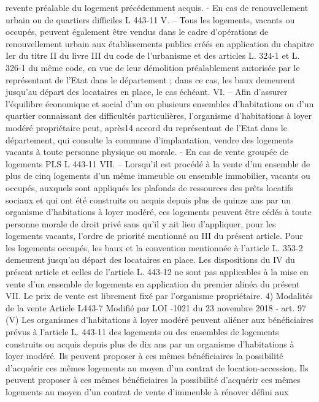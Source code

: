 \documentclass[11pt,a4paper]{report}
\begin{document}
	revente préalable du logement précédemment acquis.
	- En cas de renouvellement urbain ou de quartiers difficiles
	L 443-11 V. – Tous les logements, vacants ou occupés, peuvent également être vendus dans le cadre
	d'opérations de renouvellement urbain aux établissements publics créés en application du chapitre Ier du titre II
	du livre III du code de l'urbanisme et des articles L. 324-1 et L. 326-1 du même code, en vue de leur démolition
	préalablement autorisée par le représentant de l'Etat dans le département ; dans ce cas, les baux demeurent
	jusqu'au départ des locataires en place, le cas échéant.
	VI. – Afin d'assurer l'équilibre économique et social d'un ou plusieurs ensembles d'habitations ou d'un quartier
	connaissant des difficultés particulières, l'organisme d'habitations à loyer modéré propriétaire peut, après14
	accord du représentant de l'Etat dans le département, qui consulte la commune d'implantation, vendre des
	logements vacants à toute personne physique ou morale.
	-
	En cas de vente groupée de logements PLS
	L 443-11 VII. – Lorsqu'il est procédé à la vente d'un ensemble de plus de cinq logements d'un même immeuble
	ou ensemble immobilier, vacants ou occupés, auxquels sont appliqués les plafonds de ressources des prêts
	locatifs sociaux et qui ont été construits ou acquis depuis plus de quinze ans par un organisme d'habitations à
	loyer modéré, ces logements peuvent être cédés à toute personne morale de droit privé sans qu'il y ait lieu
	d'appliquer, pour les logements vacants, l'ordre de priorité mentionné au III du présent article. Pour les
	logements occupés, les baux et la convention mentionnée à l'article L. 353-2 demeurent jusqu'au départ des
	locataires en place.
	Les dispositions du IV du présent article et celles de l'article L. 443-12 ne sont pas applicables à la mise en
	vente d'un ensemble de logements en application du premier alinéa du présent VII. Le prix de vente est
	librement fixé par l'organisme propriétaire.
	4)
	Modalités de la vente
	Article L443-7 Modifié par LOI -1021 du 23 novembre 2018 - art. 97 (V)
	Les organismes d'habitations à loyer modéré peuvent aliéner aux bénéficiaires prévus à l'article L. 443-11 des
	logements ou des ensembles de logements construits ou acquis depuis plus de dix ans par un organisme
	d'habitations à loyer modéré. Ils peuvent proposer à ces mêmes bénéficiaires la possibilité d'acquérir ces mêmes
	logements au moyen d'un contrat de location-accession. Ils peuvent proposer à ces mêmes bénéficiaires la
	possibilité d'acquérir ces mêmes logements au moyen d'un contrat de vente d'immeuble à rénover défini aux
\end{document}
